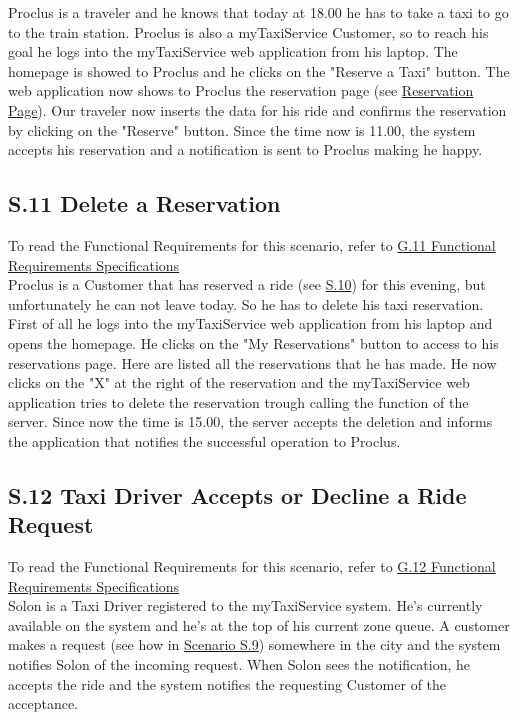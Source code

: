 		Proclus is a traveler and he knows that today at 18.00 he has to take a taxi to go to the train station. Proclus is also a myTaxiService Customer, so to reach his goal he logs into the myTaxiService web application from his laptop. The homepage is showed to Proclus and he clicks on the "Reserve a Taxi" button. The web application now shows to Proclus the reservation page (see \hyperref[reservation_w]{Reservation Page}).
		Our traveler now inserts the data for his ride and confirms the reservation by clicking on the "Reserve" button. Since the time now is 11.00, the system accepts his reservation and a notification is sent to Proclus making he happy.

		\subsection{S.11 Delete a Reservation}\label{sec:ReservationDeletionScenario}
		To read the Functional Requirements for this scenario, refer to \hyperref[sec:frs11]{G.11 Functional Requirements Specifications}\\

		Proclus is a Customer that has reserved a ride (see \hyperref[sec:TaxiReservationScenario]{S.10}) for this evening, but unfortunately he can not leave today. So he has to delete his taxi reservation. First of all he logs into the myTaxiService web application from his laptop and opens the homepage. He clicks on the "My Reservations" button to access to his reservations page. Here are listed all the reservations that he has made. He now clicks on the "X" at the right of the reservation and the myTaxiService web application tries to delete the reservation trough calling the function of the server. Since now the time is 15.00, the server accepts the deletion and informs the application that notifies the successful operation to Proclus.

		\subsection{S.12 Taxi Driver Accepts or Decline a Ride Request}\label{sec:RequestAcceptDeclineScenario}
		To read the Functional Requirements for this scenario, refer to \hyperref[sec:frs12]{G.12 Functional Requirements Specifications}\\

		Solon is a Taxi Driver registered to the myTaxiService system. He's currently available on the system and he's at the top of his current zone queue. A customer makes a request (see how in \hyperref[sec:TaxiRequiringScenario]{Scenario S.9}) somewhere in the city and the system notifies Solon of the incoming request. When Solon sees the notification, he accepts the ride and the system notifies the requesting Customer of the acceptance.


